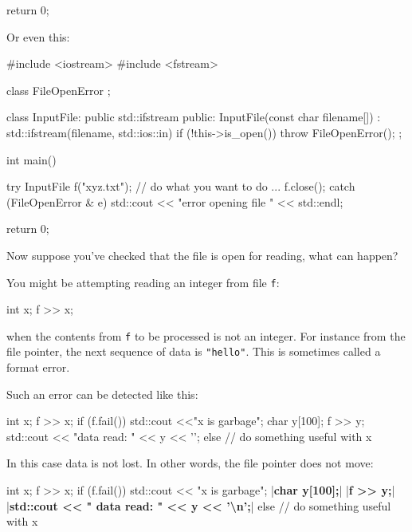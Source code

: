 \begin{consolethree}[escapeinside=||]
\begin{console}
{     return 0;
}
\end{console}

Or even this:

\begin{console}
#include <iostream>
#include <fstream>

class FileOpenError
{};

class InputFile: public std::ifstream
{
public:
     InputFile(const char filename[])
       : std::ifstream(filename, std::ios::in)
     {
        if (!this->is_open())
           throw FileOpenError();
     }
};

int main()
{   
    try
    {
        InputFile f("xyz.txt");
        // do what you want to do ...
        f.close();
    }
    catch (FileOpenError & e)
    {   
        std::cout << "error opening file "
                  << std::endl;
    }
    
    return 0;

}
\end{console}

\newpage{}

Now suppose you've checked that the file is open for reading, what can happen?

You might be attempting reading an integer from file \texttt{f}:

\begin{console}
int x;
f >> x;
\end{console}

when the contents from \texttt{f} to be processed is not an integer. For instance from the file pointer, the next sequence of data is \texttt{"hello"}. This is sometimes called a format error.

Such an error can be detected like this:
\begin{console}
int x;
f >> x;
if (f.fail())
{  
    std::cout <<"x is garbage\n";
    char y[100];
    f >> y;
    std::cout << "data read: " << y << '\n';
}
else
{   
    // do something useful with x
}
\end{console}

In this case data is not lost. In other words, the file pointer does not
move:

\begin{consolethree}[escapeinside=||]
int x;
f >> x;
if (f.fail())
{    
     std::cout << "x is garbage\n";
     |\textbf{char y[100];}|
     |\textbf{f >> y;}|
     |\textbf{std::cout << " data read: " << y << '\textbackslash n';}|
}
else
{    
     // do something useful with x
}
\end{consolethree}


\end{consolethree}
